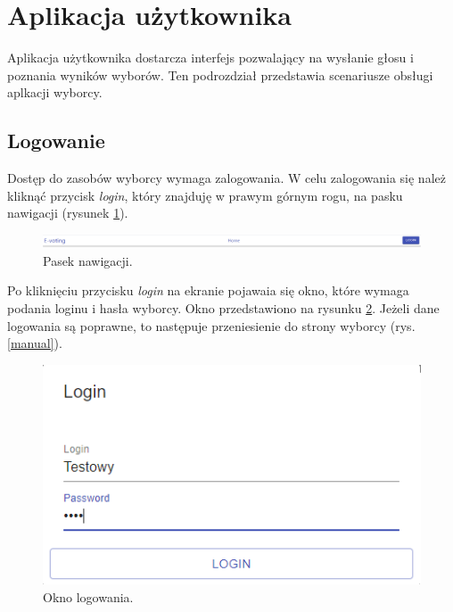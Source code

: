 \documentclass[a4paper,12pt]{book}
\begin{document}
\section{Aplikacja użytkownika}

Aplikacja użytkownika dostarcza interfejs pozwalający na wysłanie głosu i poznania wyników wyborów. Ten podrozdział przedstawia scenariusze obsługi aplkacji wyborcy.

\subsection{Logowanie}

Dostęp do zasobów wyborcy wymaga zalogowania. W celu zalogowania się należ kliknąć przycisk \textit{login}, który znajduję w prawym górnym rogu, na pasku nawigacji (rysunek \ref{navlogin}).

\begin{figure}[h]
	\centering
	\includegraphics[width=\textwidth]{images/navlogin.png}
	\caption{Pasek nawigacji.}\label{navlogin}
\end {figure}

Po kliknięciu przycisku \textit{login} na ekranie pojawaia się okno, które wymaga podania loginu i hasła wyborcy. Okno przedstawiono na rysunku \ref{userlogin}. Jeżeli dane logowania są poprawne, to następuje przeniesienie do strony wyborcy (rys. \ref{manual}).

\begin{figure}[h]
	\centering
	\includegraphics{images/userlogin.png}
	\caption{Okno logowania.}\label{userlogin}
\end {figure}
\end{document}
